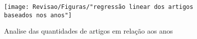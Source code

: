 \begin{figure}[!htb]
	\centering
	\caption{Analise das quantidades de artigos em relação aos anos}
	\label{fig:regressao-linear-dos-artigos-baseados-nos-anos}
	\texttt{[image: Revisao/Figuras/"regressão linear dos artigos baseados nos anos"]}
	
\end{figure}